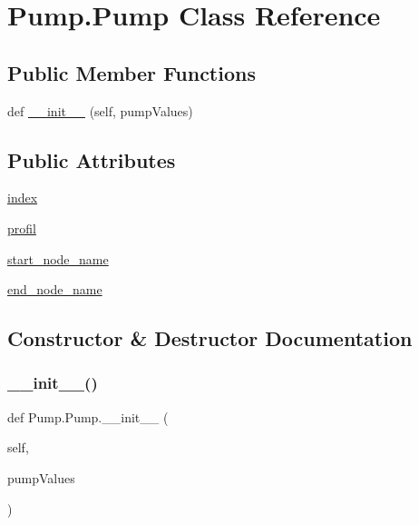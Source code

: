 \hypertarget{class_pump_1_1_pump}{}\section{Pump.\+Pump Class Reference}
\label{class_pump_1_1_pump}
\subsection*{Public Member Functions}
\begin{DoxyCompactItemize}
\item 
def \hyperlink{class_pump_1_1_pump_ad14459de937821f1a7da00d1bc441736}{\+\_\+\+\_\+init\+\_\+\+\_\+} (self, pump\+Values)
\end{DoxyCompactItemize}
\subsection*{Public Attributes}
\begin{DoxyCompactItemize}
\item 
\hyperlink{class_pump_1_1_pump_a4949cef4c42e9e9c5d4aafeabfba6713}{index}
\item 
\hyperlink{class_pump_1_1_pump_accd80242e8b18e06dd204bd713faa6eb}{profil}
\item 
\hyperlink{class_pump_1_1_pump_af8930a9eacd9a2dc69ee882b522c835d}{start\+\_\+node\+\_\+name}
\item 
\hyperlink{class_pump_1_1_pump_a42e1787eafa24a302374f18027810c42}{end\+\_\+node\+\_\+name}
\end{DoxyCompactItemize}


\subsection{Constructor \& Destructor Documentation}
\mbox{\label{class_pump_1_1_pump_ad14459de937821f1a7da00d1bc441736}} 
\subsubsection{\texorpdfstring{\+\_\+\+\_\+init\+\_\+\+\_\+()}{\_\_init\_\_()}}
{\footnotesize\ttfamily def Pump.\+Pump.\+\_\+\+\_\+init\+\_\+\+\_\+ (\begin{DoxyParamCaption}\item[{}]{self,  }\item[{}]{pump\+Values }\end{DoxyParamCaption})}



